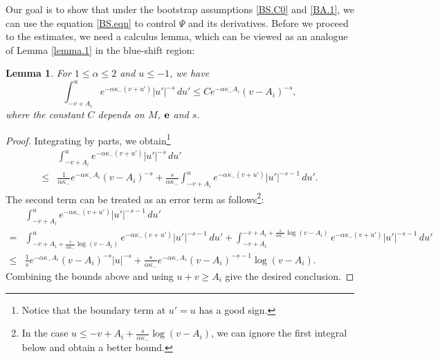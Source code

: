 \documentclass[10pt, reqno]{amsart}
\newtheorem{lemma}[theorem]{Lemma}
\theoremstyle{definition}
\theoremstyle{remark}
\numberwithin{equation}{section}
\newcommand{\0}{\emptyset}
\newcommand{\alp}{\alpha}
\newcommand{\f}{\frac}
\begin{document}
Our goal is to show that under the bootstrap assumptions \eqref{BS.C0} and \eqref{BA.1}, we can use the equation \eqref{BS.eqn} to control $\Psi$ and its derivatives. Before we proceed to the estimates, we need a calculus lemma, which can be viewed as an analogue of Lemma \ref{lemma.1} in the blue-shift region:
\begin{lemma}\label{lemma.2}
For $1\leq \alp\leq 2$ and $u \leq -1$, we have
$$\int_{-v+A_i}^u e^{-\alp\kappa_-(v+u')}|u'|^{-s}\, du'\leq Ce^{-\alpha\kappa_- A_i}(v-A_i)^{-s},$$
where the constant $C$ depends on $M$, ${\bf e}$ and $s$.
\end{lemma}
\begin{proof}
Integrating by parts, we obtain\footnote{Notice that the boundary term at $u'=u$ has a good sign.}
\begin{equation*}
\begin{split}
&\int_{-v+A_i}^u e^{-\alp\kappa_-(v+u')}|u'|^{-s}\, du' \\
\leq & \f 1{\alp\kappa_-} e^{-\alp\kappa_-A_i}(v-A_i)^{-s}+\f{s}{\alp\kappa_-} \int_{-v+A_i}^u e^{-\alp\kappa_-(v+u')}|u'|^{-s-1}\, du'.
\end{split}
\end{equation*}
The second term can be treated as an error term as follows\footnote{In the case $u\leq -v+A_i+\f s{\alp\kappa_-} \log (v-A_i)$, we can ignore the first integral below and obtain a better bound.}:
\begin{equation*}
\begin{split}
&\int_{-v+A_i}^u e^{-\alp\kappa_-(v+u')}|u'|^{-s-1}\, du' \\
= & \int_{-v+A_i+\f s{\alp\kappa_-} \log (v-A_i)}^u e^{-\alp\kappa_-(v+u')}|u'|^{-s-1}\, du'+\int_{-v+A_i}^{-v+A_i+\f s{\alp\kappa_-} \log (v-A_i)} e^{-\alp\kappa_-(v+u')}|u'|^{-s-1}\, du'\\
\leq & \f{1}{s} e^{-\alp\kappa_-A_i}(v-A_i)^{-s}|u|^{-s}+\f s{\alp\kappa_-} e^{-\alp\kappa_- A_i} (v-A_i)^{-s-1} \log (v-A_i) .
\end{split}
\end{equation*}
Combining the bounds above and using $u+v\geq A_i$ give the desired conclusion.
\end{proof}
\end{document}
